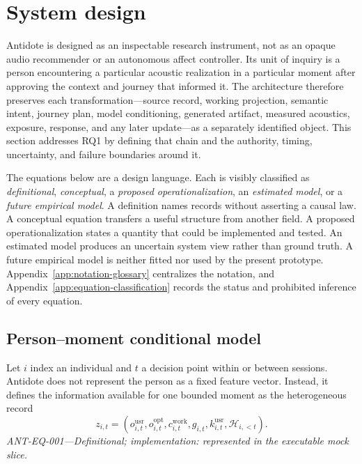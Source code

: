 \section{System design}
\label{sec:system-design}

Antidote is designed as an inspectable research instrument, not as an opaque
audio recommender or an autonomous affect controller. Its unit of inquiry is a
person encountering a particular acoustic realization in a particular moment
after approving the context and journey that informed it. The architecture
therefore preserves each transformation---source record, working projection,
semantic intent, journey plan, model conditioning, generated artifact,
measured acoustics, exposure, response, and any later update---as a separately
identified object. This section addresses RQ1 by defining that chain and the
authority, timing, uncertainty, and failure boundaries around it.

The equations below are a design language. Each is visibly classified as
\emph{definitional}, \emph{conceptual}, a \emph{proposed operationalization},
an \emph{estimated model}, or a \emph{future empirical model}. A definition
names records without asserting a causal law. A conceptual equation transfers
a useful structure from another field. A proposed operationalization states a
quantity that could be implemented and tested. An estimated model produces an
uncertain system view rather than ground truth. A future empirical model is
neither fitted nor used by the present prototype. Appendix~\ref{app:notation-glossary}
centralizes the notation, and Appendix~\ref{app:equation-classification}
records the status and prohibited inference of every equation.

\subsection{Person--moment conditional model}
\label{sec:conceptual-conditional-model}

Let $i$ index an individual and $t$ a decision point within or between
sessions. Antidote does not represent the person as a fixed feature vector.
Instead, it defines the information available for one bounded moment as the
heterogeneous record
\begin{equation}
  z_{i,t} =
  \left(
    o^{\mathrm{usr}}_{i,t},
    o^{\mathrm{opt}}_{i,t},
    c^{\mathrm{work}}_{i,t},
    g_{i,t},
    k^{\mathrm{usr}}_{i,t},
    \mathcal{H}_{i,<t}
  \right).
  \label{eq:moment-record}
\end{equation}
\noindent\textit{ANT-EQ-001---Definitional; implementation: represented in
the executable mock slice.}

